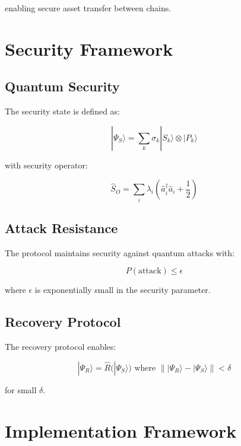 \documentclass[12pt]{article}
\begin{document}
enabling secure asset transfer between chains.

\section{Security Framework}

\subsection{Quantum Security}

The security state is defined as:

\begin{equation}
|\Psi_S\rangle = \sum_k \sigma_k|S_k\rangle \otimes |P_k\rangle
\end{equation}

with security operator:

\begin{equation}
\hat{S}_O = \sum_i \lambda_i(\hat{a}_i^\dagger\hat{a}_i + \frac{1}{2})
\end{equation}

\subsection{Attack Resistance}

The protocol maintains security against quantum attacks with:

\begin{equation}
P(\text{attack}) \leq \epsilon
\end{equation}

where $\epsilon$ is exponentially small in the security parameter.

\subsection{Recovery Protocol}

The recovery protocol enables:

\begin{equation}
|\Psi_R\rangle = \hat{R}(|\Psi_S\rangle) \text{ where } \||\Psi_R\rangle - |\Psi_S\rangle\| < \delta
\end{equation}

for small $\delta$.

\section{Implementation Framework}
\end{document}
